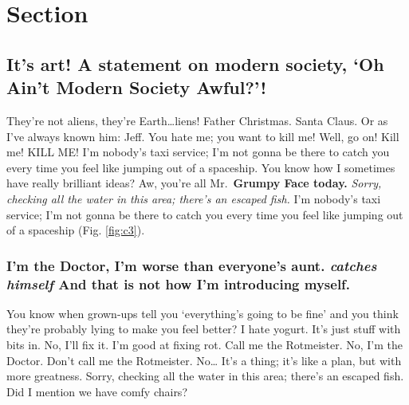\label{chapter-3}

\hypertarget{section-3.1}{%
\section{Section}\label{section-3.1}}

\hypertarget{its-art-a-statement-on-modern-society-oh-aint-modern-society-awful}{%
\subsection{It's art! A statement on modern society, `Oh Ain't Modern
Society
Awful?'!}\label{its-art-a-statement-on-modern-society-oh-aint-modern-society-awful}}

They're not aliens, they're Earth\ldots{}liens! Father Christmas. Santa
Claus. Or as I've always known him: Jeff. You hate me; you want to kill
me! Well, go on! Kill me! KILL ME! I'm nobody's taxi service; I'm not
gonna be there to catch you every time you feel like jumping out of a
spaceship. You know how I sometimes have really brilliant ideas? Aw,
you're all Mr.~\textbf{Grumpy Face today.} \emph{Sorry, checking all the
water in this area; there's an escaped fish.} I'm nobody's taxi service;
I'm not gonna be there to catch you every time you feel like jumping out
of a spaceship (Fig. \ref{fig:c3}).



\hypertarget{im-the-doctor-im-worse-than-everyones-aunt.-catches-himself-and-that-is-not-how-im-introducing-myself.}{%
\subsubsection{\texorpdfstring{I'm the Doctor, I'm worse than everyone's
aunt. \emph{catches himself} And that is not how I'm introducing
myself.}{I'm the Doctor, I'm worse than everyone's aunt. catches himself And that is not how I'm introducing myself.}}\label{im-the-doctor-im-worse-than-everyones-aunt.-catches-himself-and-that-is-not-how-im-introducing-myself.}}

You know when grown-ups tell you `everything's going to be fine' and you
think they're probably lying to make you feel better? I hate yogurt.
It's just stuff with bits in. No, I'll fix it. I'm good at fixing rot.
Call me the Rotmeister. No, I'm the Doctor. Don't call me the
Rotmeister. No\ldots{} It's a thing; it's like a plan, but with more
greatness. Sorry, checking all the water in this area; there's an
escaped fish. Did I mention we have comfy chairs?

